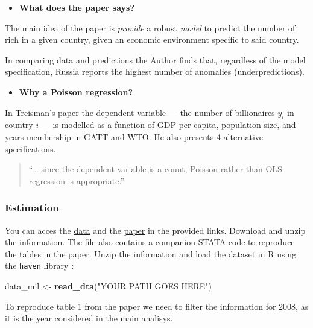 \documentclass[]{book}
\newenvironment{Shaded}{\begin{snugshade}}{\end{snugshade}}
\newcommand{\KeywordTok}[1]{\textcolor[rgb]{0.13,0.29,0.53}{\textbf{#1}}}
\newcommand{\StringTok}[1]{\textcolor[rgb]{0.31,0.60,0.02}{#1}}
\newcommand{\NormalTok}[1]{#1}
\providecommand{\tightlist}{%
  \setlength{\itemsep}{0pt}\setlength{\parskip}{0pt}}
\begin{document}
\begin{itemize}
\tightlist
\item
  \textbf{What does the paper says?}
\end{itemize}

The main idea of the paper is \emph{provide} a robust \emph{model} to
predict the number of rich in a given country, given an economic
environment specific to said country.

In comparing data and predictions the Author finds that, regardless of
the model specification, Russia reports the highest number of anomalies
(underpredictions).

\begin{itemize}
\tightlist
\item
  \textbf{Why a Poisson regression?}
\end{itemize}

In Treisman's paper the dependent variable --- the number of
billionaires \(y_i\) in country \(i\) --- is modelled as a function of
GDP per capita, population size, and years membership in GATT and WTO.
He also presents 4 alternative specifications.

\begin{quote}
``\ldots{} since the dependent variable is a count, Poisson rather than
OLS regression is appropriate.''
\end{quote}

\subsubsection{Estimation}\label{estimation}

You can acces the
\href{https://www.aeaweb.org/aer/data/10605/P2016_1068_data.zip}{data}
and the
\href{https://pubs.aeaweb.org/doi/pdfplus/10.1257/aer.p20161068}{paper}
in the provided links. Download and unzip the information. The file also
contains a companion STATA code to reproduce the tables in the paper.
Unzip the information and load the dataset in R using the \texttt{haven}
library \citep{R-haven}:

\begin{Shaded}
\begin{Highlighting}[]
\NormalTok{data_mil <-}\StringTok{ }\KeywordTok{read_dta}\NormalTok{(}\StringTok{"YOUR PATH GOES HERE"}\NormalTok{)}
\end{Highlighting}
\end{Shaded}

To reproduce table 1 from the paper we need to filter the information
for 2008, as it is the year considered in the main analisys.
\end{document}
